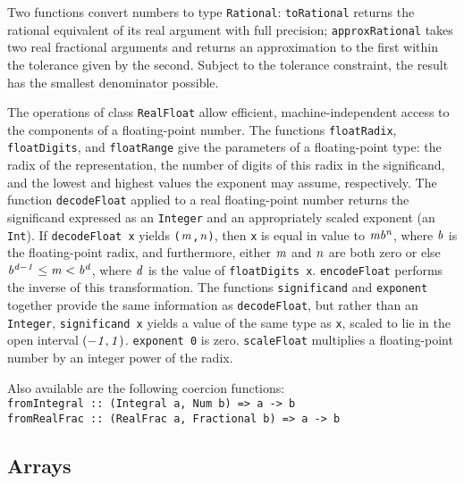 {Two functions convert numbers to type \mbox{\tt Rational}:
\mbox{\tt toRational} returns the rational equivalent of
its real argument with full precision;
\mbox{\tt approxRational} takes two real fractional arguments and returns an
approximation to the first within the tolerance given by the second.
Subject to the tolerance constraint, the result has the smallest
denominator possible.

The operations of class \mbox{\tt RealFloat} allow efficient, machine-independent
access to the components of a floating-point number.
The functions \mbox{\tt floatRadix},
\mbox{\tt floatDigits}, and
\mbox{\tt floatRange} give the parameters of a
floating-point type:  the radix of the representation, the number of
digits of this radix in the significand, and the lowest and highest
values the exponent may assume, respectively.
The function \mbox{\tt decodeFloat}
applied to a real floating-point number returns the significand
expressed as an \mbox{\tt Integer} and an appropriately scaled exponent (an
\mbox{\tt Int}).  If \mbox{\mbox{\tt decodeFloat\ x}} yields \mbox{\mbox{\tt (}\mbox{$\it m$}\mbox{\tt ,}\mbox{$\it n$}\mbox{\tt )}}, then \mbox{\tt x} is
equal in value to \mbox{$\it mb^n$}, where \mbox{$\it b$} is the floating-point radix, and
furthermore, either \mbox{$\it m$} and \mbox{$\it n$} are both zero or else
\mbox{$\it b^{d-1}\leq m<b^d$}, where \mbox{$\it d$} is the value of \mbox{\mbox{\tt floatDigits\ x}}.
\mbox{\tt encodeFloat} performs the inverse of this
transformation.  The functions \mbox{\tt significand}
and \mbox{\tt exponent} together provide the same
information as \mbox{\tt decodeFloat},  but rather than an \mbox{\tt Integer},
\mbox{\mbox{\tt significand\ x}} yields a value of the same type as \mbox{\tt x}, scaled to lie
in the open interval \mbox{$\it (-1,1)$}.  \mbox{\mbox{\tt exponent\ 0}} is zero.  \mbox{\tt scaleFloat}
multiplies a floating-point number by an integer power of the radix.

Also available are the following coercion functions:
\bprog
\mbox{\tt fromIntegral\ ::\ (Integral\ a,\ Num\ b)\ =>\ a\ ->\ b}\\
\mbox{\tt fromRealFrac\ ::\ (RealFrac\ a,\ Fractional\ b)\ =>\ a\ ->\ b}
\eprogNoSkip{}

\subsection{Arrays}
\label{arrays}

}
